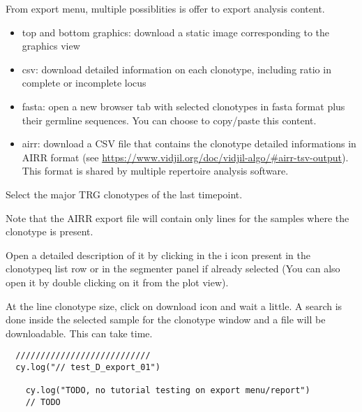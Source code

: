 From export menu, multiple possiblities is offer to export analysis content.
\begin{itemize}
  \item top and bottom graphics:  download a static image corresponding to the graphics view
  \item csv:  download detailed information on each clonotype, including ratio in
complete or incomplete locus %
  \item fasta: open a new browser tab with selected clonotypes in fasta format plus their germline sequences. You can choose to copy/paste this content.
  \item airr: download a CSV file that contains the clonotype detailed
informations in AIRR format (see \url{https://www.vidjil.org/doc/vidjil-algo/#airr-tsv-output}). This format is shared by multiple repertoire analysis software. 
\end{itemize}

Select the major TRG clonotypes of the last timepoint.

Note that the AIRR export file will contain only lines for the samples where the clonotype is present.



Open a detailed description of it by clicking in the {i icon} present in the clonotypeq list row or in the segmenter panel if already selected (You can also open it by double clicking on it from the plot view).


At the line clonotype size, click on download icon and wait a little. 
A search is done inside the selected sample for the clonotype window and a file will be downloadable. 
This can take time. 

\begin{verbatim}
  ///////////////////////////
  cy.log("// test_D_export_01")

    cy.log("TODO, no tutorial testing on export menu/report")
    // TODO

\end{verbatim}

